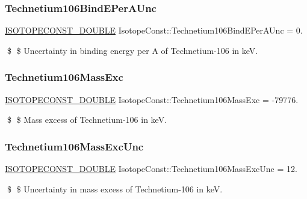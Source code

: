 \subsubsection{\texorpdfstring{Technetium106\+Bind\+E\+Per\+A\+Unc}{Technetium106BindEPerAUnc}}
{\footnotesize\ttfamily \mbox{\hyperlink{group___isotope_const-_macros_ga8f45a7272ce02c0b4c65c44636ed719a}{I\+S\+O\+T\+O\+P\+E\+C\+O\+N\+S\+T\+\_\+\+D\+O\+U\+B\+LE}} Isotope\+Const\+::\+Technetium106\+Bind\+E\+Per\+A\+Unc = 0.}

\$ \$ Uncertainty in binding energy per A of Technetium-\/106 in keV. \mbox{\label{group___isotope_const-_technetium-_tc106_gacf5f7aa841925a4c85ab3ca76bd39442}} 
\subsubsection{\texorpdfstring{Technetium106\+Mass\+Exc}{Technetium106MassExc}}
{\footnotesize\ttfamily \mbox{\hyperlink{group___isotope_const-_macros_ga8f45a7272ce02c0b4c65c44636ed719a}{I\+S\+O\+T\+O\+P\+E\+C\+O\+N\+S\+T\+\_\+\+D\+O\+U\+B\+LE}} Isotope\+Const\+::\+Technetium106\+Mass\+Exc = -\/79776.}

\$ \$ Mass excess of Technetium-\/106 in keV. \mbox{\label{group___isotope_const-_technetium-_tc106_gaa8cc4f359a990bb13a6eba69990a8b90}} 
\subsubsection{\texorpdfstring{Technetium106\+Mass\+Exc\+Unc}{Technetium106MassExcUnc}}
{\footnotesize\ttfamily \mbox{\hyperlink{group___isotope_const-_macros_ga8f45a7272ce02c0b4c65c44636ed719a}{I\+S\+O\+T\+O\+P\+E\+C\+O\+N\+S\+T\+\_\+\+D\+O\+U\+B\+LE}} Isotope\+Const\+::\+Technetium106\+Mass\+Exc\+Unc = 12.}

\$ \$ Uncertainty in mass excess of Technetium-\/106 in keV. \mbox{\label{group___isotope_const-_technetium-_tc106_ga2285206288e545e641bd182f165388d7}} 
